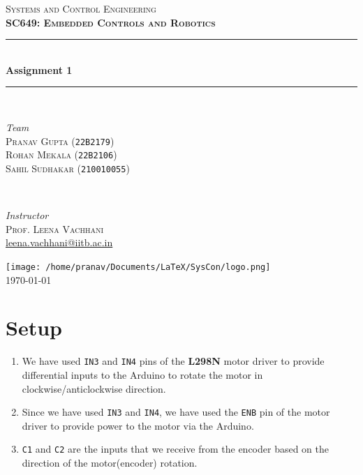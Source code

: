 \documentclass[12pt]{article}
\begin{document}
\begin{titlepage}
	\newcommand{\HRule}{\rule{\linewidth}{0.5mm}}
	\center
	
	\textsc{\Huge Systems and Control Engineering}\\[1.5cm]	
	\textsc{\LARGE\bfseries SC649: Embedded Controls and Robotics}\\[1cm] %
	
	\HRule\\[0.4cm]	
	{\huge\bfseries Assignment 1}\\[0.2cm] %
	\HRule\\[1.5cm]
	
	\begin{minipage}{0.4\textwidth}
		\begin{flushleft}
			\large
			\textit{Team}\\
			\textsc{Pranav Gupta} (\texttt{22B2179})\\
			\textsc{Rohan Mekala} (\texttt{22B2106})\\
			\textsc{Sahil Sudhakar} (\texttt{210010055})\\
		\end{flushleft}
	\end{minipage}
	~
	\begin{minipage}{0.4\textwidth}
		\begin{flushright}
			\large
			\textit{Instructor}\\
			\textsc{Prof. Leena Vachhani}\\
            \href{mailto:leena.vachhani@iitb.ac.in}{leena.vachhani@iitb.ac.in}
		\end{flushright}
	\end{minipage}
	
	\vfill\vfill\vfill
	\texttt{[image: /home/pranav/Documents/LaTeX/SysCon/logo.png]}\\[1cm]
	
	\vfill\vfill
	{\LARGE \today}
	\vfill
	
\end{titlepage}

\pagebreak
\tableofcontents
\pagebreak

\section{Setup}
\begin{enumerate}
    \item We have used \texttt{IN3} and \texttt{IN4} pins of the \textbf{\textbf{L298N}} motor driver to provide differential inputs to the Arduino to rotate the motor in clockwise/anticlockwise direction.
    \item Since we have used \texttt{IN3} and \texttt{IN4}, we have used the \texttt{\texttt{ENB}} pin of the motor driver to provide power to the motor via the Arduino.
    \item \texttt{\texttt{C1}} and \texttt{\texttt{C2}} are the inputs that we receive from the encoder based on the direction of the motor(encoder) rotation.
\end{enumerate}
\end{document}
